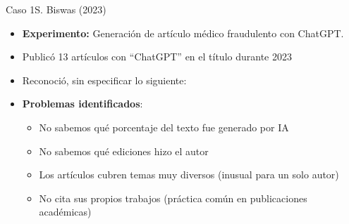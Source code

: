 \begin{frame}{Caso 1}{S. Biswas (2023)}
    \begin{itemize}
        \item \textbf{Experimento:} Generación de artículo médico fraudulento con ChatGPT.

        \item Publicó 13 artículos con ``ChatGPT'' en el título durante 2023
        \item Reconoció, sin especificar lo siguiente:
              \begin{center}
              \end{center}
        \item \textbf{Problemas identificados}:
              \begin{itemize}
                  \item No sabemos qué porcentaje del texto fue generado por IA
                  \item No sabemos qué ediciones hizo el autor
                  \item Los artículos cubren temas muy diversos (inusual para un solo autor)
                  \item No cita sus propios trabajos (práctica común en publicaciones académicas)
              \end{itemize}
    \end{itemize}


\end{frame}


